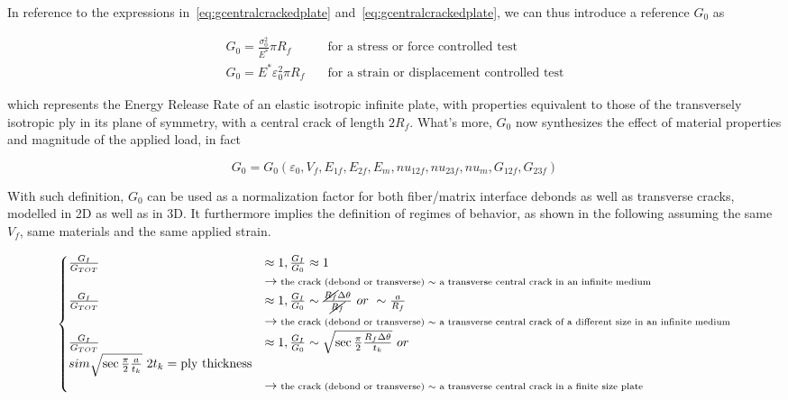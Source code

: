 \documentclass[a4paper]{jpconf}
\begin{document}
In reference to the expressions in~\ref{eq:gcentralcrackedplate} and~\ref{eq:gcentralcrackedplate}, we can thus introduce a reference $G_{0}$ as

\begin{equation}
\begin{split}
G_{0}=\frac{\sigma_{0}^{2}}{E^{*}}\pi R_{f}\quad&\text{for a stress or force controlled test}\\[5pt]
G_{0}=E^{*}\varepsilon_{0}^{2}\pi R_{f}\quad&\text{for a strain or displacement controlled test}
\end{split}
\end{equation}

which represents the Energy Release Rate of an elastic isotropic infinite plate, with properties equivalent to those of the transversely isotropic ply in its plane of symmetry, with a central crack of length $2R_{f}$. What's more, $G_{0}$ now synthesizes the effect of material properties and magnitude of the applied load, in fact

\begin{equation}
G_{0}=G_{0}\left(\varepsilon_{0},V_{f},E_{1f},E_{2f},E_{m},nu_{12f},nu_{23f},nu_{m},G_{12f},G_{23f}\right)
\end{equation}

With such definition, $G_{0}$ can be used as a normalization factor for both fiber/matrix interface debonds as well as transverse cracks, modelled in 2D as well as in 3D. It furthermore implies the definition of regimes of behavior, as shown in the following assuming the same $V_{f}$, same materials and the same applied strain.

\begin{equation}
\begin{cases}
\frac{G_{I}}{G_{TOT}}&\approx 1, \frac{G_{I}}{G_{0}}\approx 1\\ &\rightarrow\text{\scriptsize the crack (debond or transverse) $\sim$ a transverse central crack in an infinite medium}\\
\frac{G_{I}}{G_{TOT}}&\approx 1, \frac{G_{I}}{G_{0}}\sim\frac{\cancel{R_{f}}\Delta\theta}{\cancel{R_{f}}}\ or\  \sim\frac{a}{R_{f}}\\ &\rightarrow\text{\scriptsize the crack (debond or transverse) $\sim$ a transverse central crack of a different size in an infinite medium}\\
\frac{G_{I}}{G_{TOT}}&\approx 1, \frac{G_{I}}{G_{0}}\sim\sqrt{\sec{\frac{\pi}{2}\frac{R_{f}\Delta\theta}{t_{k}}}}\ or \\sim\sqrt{\sec{\frac{\pi}{2}\frac{a}{t_{k}}}}\ 2t_{k}=\text{ply thickness}\\ &\rightarrow\text{\scriptsize the crack (debond or transverse) $\sim$ a transverse central crack in a finite size plate}\\
\end{cases}
\end{equation}
\end{document}
